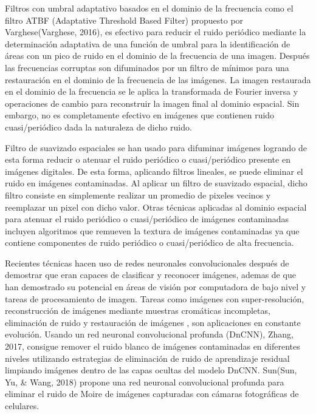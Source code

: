 \documentclass[10pt,letterpaper]{article}
\begin{document}
Filtros con umbral adaptativo basados en el dominio de la frecuencia como el filtro ATBF (Adaptative Threshold Based Filter) propuesto por Varghese(Varghese, 2016),  es efectivo para reducir el ruido periódico mediante la determinación adaptativa de una función de umbral para la identificación de áreas con un pico de ruido en el dominio de la frecuencia de una imagen. Después las frecuencias corruptas son difuminados por un filtro de mínimos para una restauración en el dominio de la frecuencia de las imágenes. La imagen restaurada en el dominio de la frecuencia se le aplica la transformada de Fourier inversa y operaciones de cambio para reconstruir la imagen final al dominio espacial\cite{Varghese:}. Sin embargo, no es completamente efectivo en imágenes que contienen ruido cuasi/periódico dada la naturaleza de dicho ruido. %

Filtro de suavizado espaciales se han usado para difuminar imágenes logrando de esta forma reducir o atenuar el ruido periódico o cuasi/periódico presente en imágenes digitales. De esta forma, aplicando filtros lineales, se puede eliminar el ruido en imágenes contaminadas. Al aplicar un filtro de suavizado espacial, dicho filtro consiste en simplemente realizar un promedio de pixeles vecinos y reemplazar un pixel con dicho valor\cite{Gonz:Rich}. Otras técnicas aplicadas al dominio espacial para atenuar el ruido periódico o cuasi/periódico de imágenes contaminadas incluyen algoritmos que remueven la textura de imágenes contaminadas ya que contiene componentes de ruido periódico o cuasi/periódico de alta frecuencia\cite{Kara:Erde}\cite{Ono:Miya}\cite{Ok:Youn}. %

Recientes técnicas hacen uso de redes neuronales convolucionales después de demostrar que eran capaces de clasificar\cite{Kriz:Suts} y reconocer imágenes\cite{Simo:Ziss}\cite{Szeg:Liu}, ademas de que han demostrado su potencial en áreas de visión por computadora de bajo nivel y tareas de procesamiento de imagen. Tareas como imágenes con super-resolución\cite{Dong:Loy}, reconstrucción de imágenes mediante muestras cromáticas incompletas\cite{Ghar:Chaur}, eliminación de ruido\cite{Ghar:Chaur} y restauración de imágenes \cite{Zhan:Zuo}, son aplicaciones en constante evolución. Usando un red neuronal convolucional profunda (DnCNN), Zhang, 2017, consigue remover el ruido blanco de imágenes contaminadas en diferentes niveles utilizando estrategias de eliminación de ruido de aprendizaje residual limpiando imágenes dentro de las capas ocultas del modelo DnCNN\cite{Zhan:Zuo1}. Sun(Sun, Yu, \& Wang, 2018)\cite{Sun:Yu} propone una red neuronal convolucional profunda para eliminar el ruido de Moire de imágenes capturadas con cámaras fotográficas de celulares. %
\end{document}
